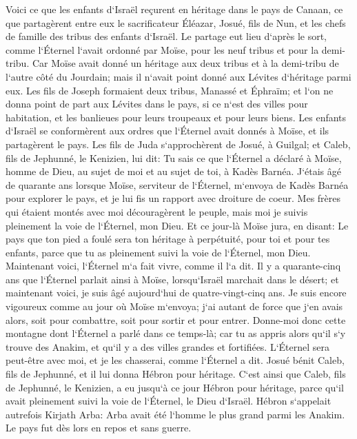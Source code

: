 \verse Voici ce que les enfants d`Israël reçurent en héritage dans le pays de Canaan, ce que partagèrent entre eux le sacrificateur Éléazar, Josué, fils de Nun, et les chefs de famille des tribus des enfants d`Israël. 
\verse Le partage eut lieu d`après le sort, comme l`Éternel l`avait ordonné par Moïse, pour les neuf tribus et pour la demi-tribu. 
\verse Car Moïse avait donné un héritage aux deux tribus et à la demi-tribu de l`autre côté du Jourdain; mais il n`avait point donné aux Lévites d`héritage parmi eux. 
\verse Les fils de Joseph formaient deux tribus, Manassé et Éphraïm; et l`on ne donna point de part aux Lévites dans le pays, si ce n`est des villes pour habitation, et les banlieues pour leurs troupeaux et pour leurs biens. 
\verse Les enfants d`Israël se conformèrent aux ordres que l`Éternel avait donnés à Moïse, et ils partagèrent le pays. 
\verse Les fils de Juda s`approchèrent de Josué, à Guilgal; et Caleb, fils de Jephunné, le Kenizien, lui dit: Tu sais ce que l`Éternel a déclaré à Moïse, homme de Dieu, au sujet de moi et au sujet de toi, à Kadès Barnéa. 
\verse J`étais âgé de quarante ans lorsque Moïse, serviteur de l`Éternel, m`envoya de Kadès Barnéa pour explorer le pays, et je lui fis un rapport avec droiture de coeur. 
\verse Mes frères qui étaient montés avec moi découragèrent le peuple, mais moi je suivis pleinement la voie de l`Éternel, mon Dieu. 
\verse Et ce jour-là Moïse jura, en disant: Le pays que ton pied a foulé sera ton héritage à perpétuité, pour toi et pour tes enfants, parce que tu as pleinement suivi la voie de l`Éternel, mon Dieu. 
\verse Maintenant voici, l`Éternel m`a fait vivre, comme il l`a dit. Il y a quarante-cinq ans que l`Éternel parlait ainsi à Moïse, lorsqu`Israël marchait dans le désert; et maintenant voici, je suis âgé aujourd`hui de quatre-vingt-cinq ans. 
\verse Je suis encore vigoureux comme au jour où Moïse m`envoya; j`ai autant de force que j`en avais alors, soit pour combattre, soit pour sortir et pour entrer. 
\verse Donne-moi donc cette montagne dont l`Éternel a parlé dans ce temps-là; car tu as appris alors qu`il s`y trouve des Anakim, et qu`il y a des villes grandes et fortifiées. L`Éternel sera peut-être avec moi, et je les chasserai, comme l`Éternel a dit. 
\verse Josué bénit Caleb, fils de Jephunné, et il lui donna Hébron pour héritage. 
\verse C`est ainsi que Caleb, fils de Jephunné, le Kenizien, a eu jusqu`à ce jour Hébron pour héritage, parce qu`il avait pleinement suivi la voie de l`Éternel, le Dieu d`Israël. 
\verse Hébron s`appelait autrefois Kirjath Arba: Arba avait été l`homme le plus grand parmi les Anakim. Le pays fut dès lors en repos et sans guerre. 

